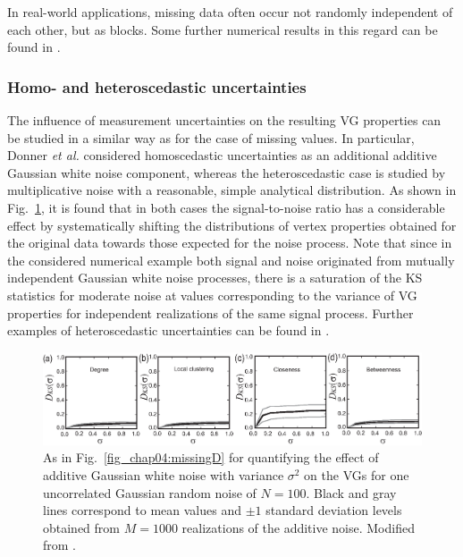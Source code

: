 		In real-world applications, missing data often occur not randomly independent of each other, but as blocks. Some further numerical results in this regard can be found in \cite{Donner2012}. 
		
		
		\subsubsection{Homo- and heteroscedastic uncertainties} 
		The influence of measurement uncertainties on the resulting VG properties can be studied in a similar way as for the case of missing values. In particular, Donner {\textit{et al.}} \cite{Donner2012} considered homoscedastic uncertainties as an additional additive Gaussian white noise component, whereas the heteroscedastic case is studied by multiplicative noise with a reasonable, simple analytical distribution. As shown in Fig.~\ref{fig_chap04:homouncertain}, it is found that in both cases the signal-to-noise ratio has a considerable effect by systematically shifting the distributions of vertex properties obtained for the original data towards those expected for the noise process. Note that since in the considered numerical example both signal and noise originated from mutually independent Gaussian white noise processes, there is a saturation of the KS statistics for moderate noise at values corresponding to the variance of VG properties for independent realizations of the same signal process. Further examples of heteroscedastic uncertainties can be found in \cite{Donner2012}. 
		\begin{figure}
		  \centering
		  \includegraphics[width=\columnwidth]{Chapter04_VisibilityGt/fig8N.eps}
		  \caption{As in Fig.~\ref{fig_chap04:missingD} for quantifying the effect of additive Gaussian white noise with variance $\sigma^2$ on the VGs for one uncorrelated Gaussian random noise of $N = 100$. Black and gray lines correspond to mean values and $\pm 1$ standard deviation levels obtained from $M=1000$ realizations of the additive noise. Modified from \cite{Donner2012}. \label{fig_chap04:homouncertain}} 
		\end{figure}	
		
		
